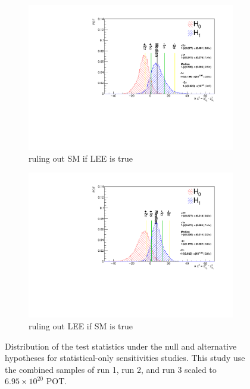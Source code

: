 \begin{figure}[ht] 
\begin{center}
    \begin{subfigure}[b]{0.48\textwidth}
        \centering
        \includegraphics[width=1.\textwidth]{Sensitivity/sensitivity-run123/SBNfit_Cls_nue_1e0p_reco_e_H1_mc_collab_statsonlyCNP_Chi.pdf}
        \caption{ruling out SM if LEE is true}
    \end{subfigure}
        \begin{subfigure}[b]{0.48\textwidth}
        \centering
        \includegraphics[width=1.\textwidth]{Sensitivity/sensitivity-run123/SBNfit_Cls_nue_1e0p_reco_e_H1_mc_collab_statsonly_exclusionCNP_Chi.pdf}
        \caption{ruling out LEE if SM is true}
    \end{subfigure}
\caption{Distribution of the test statistics under the null and alternative hypotheses for statistical-only sensitivities studies. This study use the combined samples of run 1, run 2, and run 3 scaled to $6.95\times10^{20}$ POT.}
\label{fig:1eNp:SBNFit:statonlysensitivity}
\end{center}
\end{figure}

